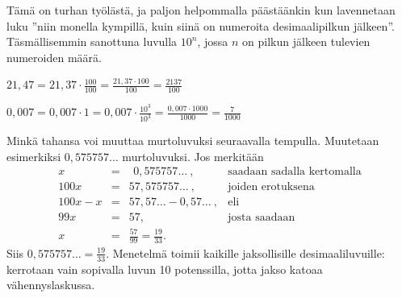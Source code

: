 Tämä on turhan työlästä, ja paljon helpommalla päästäänkin kun lavennetaan luku ''niin monella kympillä, kuin siinä on numeroita desimaalipilkun jälkeen''. Täsmällisemmin sanottuna luvulla $10^n$, jossa $n$ on pilkun jälkeen tulevien numeroiden määrä.

\begin{esimerkki}
$21,47 = 21,37 \cdot  \frac{100}{100} = \frac{21,37 \cdot 100}{100} = \frac{2137}{100}$
\end{esimerkki}

\begin{esimerkki}
$0,007 = 0,007 \cdot 1 = 0,007 \cdot \frac{10^3}{10^3} = \frac{0,007 \cdot 1000}{1000} = \frac{7}{1000}$

\end{esimerkki}


Minkä tahansa  voi muuttaa murtoluvuksi seuraavalla tempulla.
Muutetaan esimerkiksi $0,575757\ldots$ murtoluvuksi. Jos merkitään
\[
\begin{array}{rcll}
x &=& \ \, 0,575757 \ldots\ , &\textrm{saadaan sadalla kertomalla} \\
100x &=& 57,575757 \ldots \ , &\textrm{joiden erotuksena} \\
100x - x &=& 57,57 \ldots - 0,57 \ldots \ , & \textrm{eli} \\
99x &=& 57, & \textrm{josta saadaan} \\
x &=& \frac{57}{99} = \frac{19}{33}.
\end{array}
\]
Siis $0,575757\ldots = \frac{19}{33}$. Menetelmä toimii kaikille jaksollisille
desimaaliluvuille: kerrotaan vain sopivalla luvun 10 potenssilla, jotta jakso
katoaa vähennyslaskussa.

